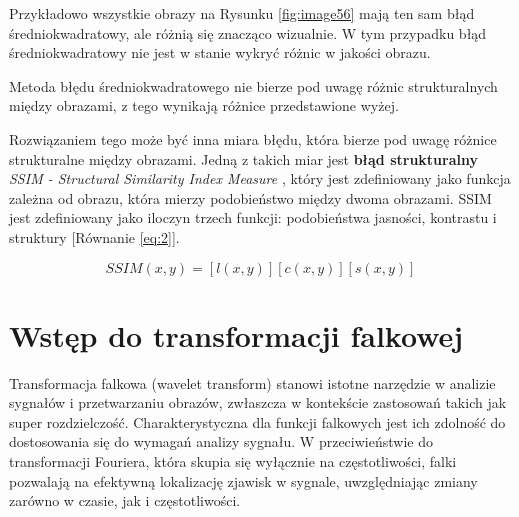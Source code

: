 Przykładowo wszystkie obrazy na Rysunku \ref{fig:image56} mają ten sam błąd średniokwadratowy, ale różnią się znacząco wizualnie. W tym przypadku błąd średniokwadratowy nie jest w stanie wykryć różnic w jakości obrazu. 

Metoda błędu średniokwadratowego nie bierze pod uwagę różnic strukturalnych między obrazami, z tego wynikają różnice przedstawione wyżej.

Rozwiązaniem tego może być inna miara błędu, która bierze pod uwagę różnice strukturalne między obrazami. Jedną z takich miar jest \textbf{błąd strukturalny} \textit{SSIM - Structural Similarity Index Measure} \cite{1284395}, który jest zdefiniowany jako funkcja zależna od obrazu, która mierzy podobieństwo między dwoma obrazami. SSIM jest zdefiniowany jako iloczyn trzech funkcji: podobieństwa jasności, kontrastu i struktury [Równanie \ref{eq:2}].

\begin{equation}
    SSIM(x,y) = [l(x,y)][c(x,y)][s(x,y)] \label{eq:2}
\end{equation}


\newpage

\section{Wstęp do transformacji falkowej}


Transformacja falkowa (wavelet transform) stanowi istotne narzędzie w analizie sygnałów i przetwarzaniu obrazów, zwłaszcza w kontekście zastosowań takich jak super rozdzielczość. Charakterystyczna dla funkcji falkowych jest ich zdolność do dostosowania się do wymagań analizy sygnału. W przeciwieństwie do transformacji Fouriera, która skupia się wyłącznie na częstotliwości, falki pozwalają na efektywną lokalizację zjawisk w sygnale, uwzględniając zmiany zarówno w czasie, jak i częstotliwości.

